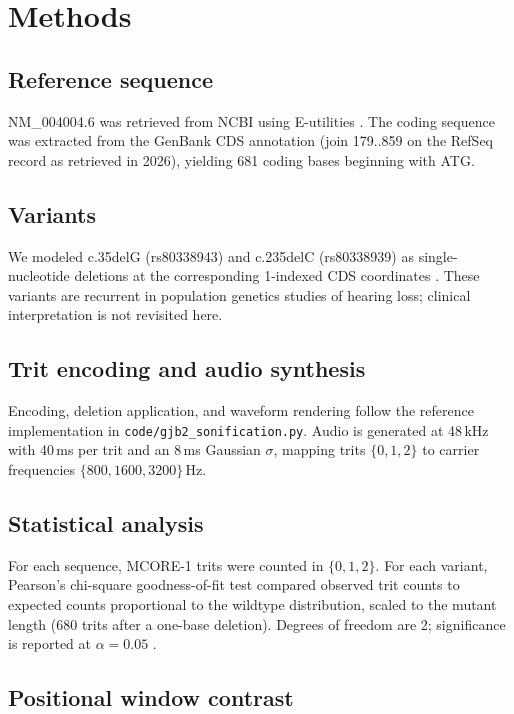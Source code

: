 \documentclass[preprint,12pt]{elsarticle}
\begin{document}
\section{Methods}

\subsection{Reference sequence}

NM\_004004.6 was retrieved from NCBI using E-utilities \citep{ncbi_nm004004}. The coding sequence was extracted from the GenBank CDS annotation (join 179..859 on the RefSeq record as retrieved in 2026), yielding 681 coding bases beginning with ATG.

\subsection{Variants}

We modeled c.35delG (rs80338943) and c.235delC (rs80338939) as single-nucleotide deletions at the corresponding 1-indexed CDS coordinates \citep{clinvar_rs80338943,clinvar_rs80338939,landrum2016clinvar}. These variants are recurrent in population genetics studies of hearing loss; clinical interpretation is not revisited here.

\subsection{Trit encoding and audio synthesis}

Encoding, deletion application, and waveform rendering follow the reference implementation in \texttt{code/gjb2\_sonification.py}. Audio is generated at 48\,kHz with 40\,ms per trit and an 8\,ms Gaussian $\sigma$, mapping trits $\{0,1,2\}$ to carrier frequencies $\{800,1600,3200\}$\,Hz.

\subsection{Statistical analysis}

For each sequence, MCORE-1 trits were counted in $\{0,1,2\}$. For each variant, Pearson's chi-square goodness-of-fit test compared observed trit counts to expected counts proportional to the wildtype distribution, scaled to the mutant length (680 trits after a one-base deletion). Degrees of freedom are 2; significance is reported at $\alpha=0.05$ \citep{agresti2002categorical}.

\subsection{Positional window contrast}
\end{document}
